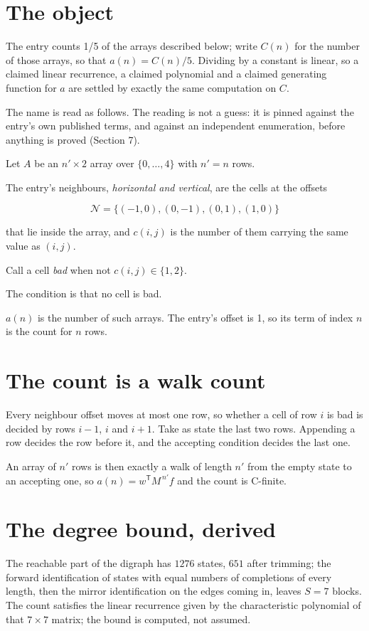 \documentclass[11pt]{article}
\theoremstyle{definition}
\begin{document}
\section{The object}

The entry counts 1/5 of the arrays described below; write $C(n)$ for the number of those arrays, so that $a(n) = C(n)/5$. Dividing by a constant is linear, so a claimed linear recurrence, a claimed polynomial and a claimed generating function for $a$ are settled by exactly the same computation on $C$.

The name is read as follows. The reading is not a guess: it is pinned against the entry's own published terms, and against an independent enumeration, before anything is proved (Section 7).

Let $A$ be an $n' \times 2$ array over $\{0,\dots,4\}$ with $n' = n$ rows.

The entry's neighbours, {\itshape horizontal and vertical}, are the cells at the offsets

\[\mathcal{N} = \{(-1,0), (0,-1), (0,1), (1,0)\}\]

that lie inside the array, and $c(i,j)$ is the number of them carrying the same value as $(i,j)$.

Call a cell {\itshape bad} when not $c(i,j) \in \{1, 2\}$.

The condition is that no cell is bad.

$a(n)$ is the number of such arrays. The entry's offset is 1, so its term of index $n$ is the count for $n$ rows.

\section{The count is a walk count}

Every neighbour offset moves at most one row, so whether a cell of row $i$ is bad is decided by rows $i-1$, $i$ and $i+1$. Take as state the last two rows. Appending a row decides the row before it, and the accepting condition decides the last one.

An array of $n'$ rows is then exactly a walk of length $n'$ from the empty state to an accepting one, so $a(n) = w^{\mathsf T}M^{\,n'}f$ and the count is C-finite.

\section{The degree bound, derived}

The reachable part of the digraph has $1276$ states, $651$ after trimming; the forward identification of states with equal numbers of completions of every length, then the mirror identification on the edges coming in, leaves $S = 7$ blocks. The count satisfies the linear recurrence given by the characteristic polynomial of that $7\times7$ matrix; the bound is computed, not assumed.
\end{document}
